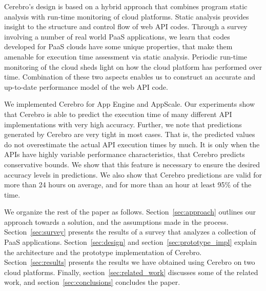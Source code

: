 Cerebro's design is based on a hybrid approach that combines program static analysis with run-time
monitoring of cloud platforms. Static analysis provides insight to the structure and control flow of web
API codes. Through a survey involving a number
of real world PaaS applications, we learn that codes developed for PaaS clouds have
some unique properties, that make them amenable for execution time assessment via static 
analysis. Periodic run-time monitoring of the cloud sheds light on how
the cloud platform has performed over time. Combination of these two aspects enables
us to construct an accurate and up-to-date performance model of the web API code. 


We implemented Cerebro for App Engine and AppScale.
Our experiments show that Cerebro is able to predict the execution time
of many different API implementations with very high accuracy. 
Further, we note that
predictions generated by Cerebro are very tight in most cases. That is, the predicted values do not
overestimate the actual API execution times by much. It is only when the APIs have highly variable 
performance characteristics, that Cerebro predicts conservative bounds. We show that this feature 
is necessary to ensure the desired accuracy levels in predictions.
We also show that Cerebro predictions
are valid for more than 24 hours on average, and for more than an hour at least 95\% of the time.

We organize the rest of the paper as follows. Section~\ref{sec:approach} outlines our approach towards
a solution, and the assumptions made in the process. Section~\ref{sec:survey}
presents the results of a survey that analyzes a collection of PaaS applications. Section~\ref{sec:design}
and section~\ref{sec:prototype_impl} explain the architecture and the prototype implementation of Cerebro.
Section~\ref{sec:results} presents the results we have obtained using Cerebro on two cloud platforms.
Finally, section~\ref{sec:related_work} discusses some of the related work, and section~\ref{sec:conclusions}
concludes the paper.